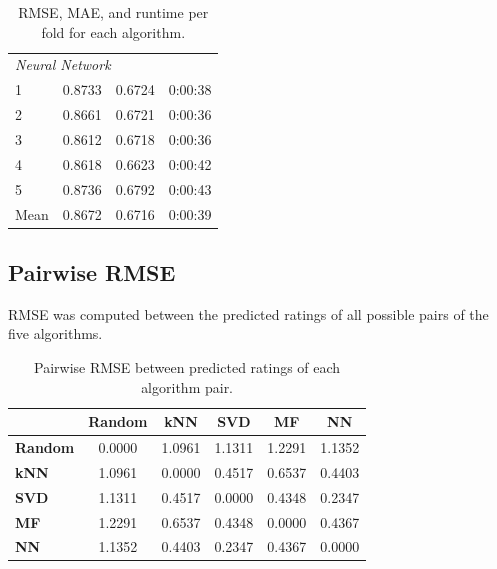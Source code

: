 {\begin{table}[H]
\begin{tabular}{lrrr}
    \hline
    \multicolumn{4}{l}{\textit{Neural Network}} \\
    1    & 0.8733 & 0.6724 & 0:00:38 \\
    2    & 0.8661 & 0.6721 & 0:00:36 \\
    3    & 0.8612 & 0.6718 & 0:00:36 \\
    4    & 0.8618 & 0.6623 & 0:00:42 \\
    5    & 0.8736 & 0.6792 & 0:00:43 \\
    Mean & 0.8672 & 0.6716 & 0:00:39 \\
    \hline
  \end{tabular}
  \caption{RMSE, MAE, and runtime per fold for each algorithm.}
  \label{tab:cv-results}
\end{table}
}

\subsection{Pairwise RMSE}

RMSE was computed between the predicted ratings of all possible pairs of the five algorithms.

{\small
\renewcommand{\arraystretch}{0.85}
\setlength{\tabcolsep}{4pt}
\begin{table}[H]
  \centering
  \begin{tabular}{l|ccccc}
    \toprule
    & \textbf{Random} & \textbf{kNN} & \textbf{SVD} & \textbf{MF} & \textbf{NN} \\
    \midrule
    \textbf{Random} & 0.0000 & 1.0961 & 1.1311 & 1.2291 & 1.1352 \\
    \textbf{kNN}    & 1.0961 & 0.0000 & 0.4517 & 0.6537 & 0.4403 \\
    \textbf{SVD}    & 1.1311 & 0.4517 & 0.0000 & 0.4348 & 0.2347 \\
    \textbf{MF}     & 1.2291 & 0.6537 & 0.4348 & 0.0000 & 0.4367 \\
    \textbf{NN}     & 1.1352 & 0.4403 & 0.2347 & 0.4367 & 0.0000 \\
    \bottomrule
  \end{tabular}
  \caption{Pairwise RMSE between predicted ratings of each algorithm pair.}
  \label{tab:pairwise-rmse}
\end{table}
}